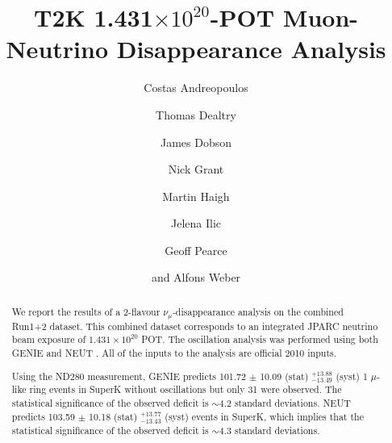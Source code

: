 %
%

\begin{frontmatter}

\title{
  T2K 1.431$\times10^{20}$-POT Muon-Neutrino Disappearance Analysis
}

\vspace*{0.7cm}

\author[RAL]     {Costas Andreopoulos}
\author[RAL,OXF] {Thomas Dealtry}
\author[ICL,RAL] {James Dobson}
\author[LANCS]   {Nick Grant}
\author[OXF]     {Martin Haigh}
\author[RAL]     {Jelena Ilic}
\author[RAL]     {Geoff Pearce}
\author[RAL,OXF] {and Alfons Weber}


\address[RAL]{Particle Physics Dept., Rutherford Appleton Laboratory, STFC \\
              Harwell Science and Innovation Campus\\
              Oxfordshire OX11 0QX, UK}
\address[OXF]{Subdepartment of Particle Physics, University of Oxford \\
              Denys Wilkinson Building, Keble Road\\
              Oxfordshire OX1 3RH, UK}
\address[LANCS]{Physics Dept., Lancaster University \\
              Lancaster, LA1 4YB, UK}
\address[ICL]{Physics Dept., Imperial College London \\
              Blackett Lab, Prince Consort Road\\
              London SW7 2BW, UK}

%
%

\begin{abstract}

We report the results of a 2-flavour $\nu_{\mu}$-disappearance analysis on the combined Run1+2 dataset.
This combined dataset corresponds to an integrated JPARC neutrino beam
exposure of $1.431 \times 10^{20}$ POT.
The oscillation analysis was performed using both GENIE \cite{Genie:NIM} and NEUT \cite{Neut:ActaP}.
All of the inputs to the analysis are official 2010 inputs.

Using the ND280 measurement, GENIE predicts 101.72 $\pm$ 10.09 (stat) $^{+13.88}_{-13.49}$ (syst)
1 $\mu$-like ring events in SuperK without oscillations but only 31 were observed.
The statistical significance of the observed deficit is $\sim$4.2 standard deviations.
NEUT predicts 103.59 $\pm$ 10.18 (stat) $^{+13.77}_{-13.43}$ (syst) events in SuperK,
which implies that the statistical significance
of the observed deficit is $\sim$4.3 standard deviations.


\end{abstract}
\end{frontmatter}
